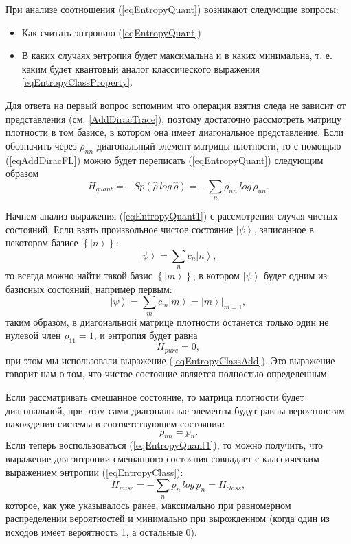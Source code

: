 При анализе соотношения (\ref{eqEntropyQuant}) возникают следующие
вопросы:
\begin{itemize}
\item Как считать энтропию (\ref{eqEntropyQuant})
\item В каких случаях энтропия будет максимальна и в каких минимальна,
  т. е. каким будет квантовый аналог классического выражения
  \ref{eqEntropyClassProperty}. 
\end{itemize}

Для ответа на первый вопрос вспомним что операция взятия следа не
зависит от представления (см. \autoref{AddDiracTrace}), поэтому
достаточно рассмотреть матрицу плотности в том базисе, в котором она имеет
диагональное представление. Если обозначить через $\rho_{nn}$
диагональный элемент матрицы плотности, то с помощью (\ref{eqAddDiracFL})
можно будет переписать (\ref{eqEntropyQuant}) следующим образом
\begin{equation}
H_{quant} = - Sp \left(\hat{\rho} \, log \, \hat{\rho}\right) = 
- \sum_n \rho_{nn} \, log \, \rho_{nn}.
\label{eqEntropyQuant1}
\end{equation}

Начнем анализ выражения (\ref{eqEntropyQuant1}) с рассмотрения случая чистых состояний.
Если взять произвольное чистое состояние $\left|\psi\right>$,
записанное в некотором базисе $\left\{\left|n\right>\right\}$:
\[
\left|\psi\right> = \sum_n c_n \left|n\right>,
\]
то всегда можно найти такой базис $\left\{\left|m\right>\right\}$, в
котором $\left|\psi\right>$ будет одним из базисных состояний, например первым: 
\[
\left|\psi\right> = \sum_m c_m \left|m\right> = 
\left.\left|m\right>\right|_{m = 1},
\]
таким образом, в диагональной матрице плотности останется только один
не нулевой член $\rho_{11} = 1$, и энтропия будет равна
\begin{equation}
H_{pure} = 0,
\label{eqQIEntropyPure}
\end{equation}
при этом мы использовали выражение (\ref{eqEntropyClassAdd}). Это
выражение говорит нам о том, что чистое состояние является полностью
определенным. 

Если рассматривать смешанное состояние, то матрица плотности будет
диагональной, при этом сами диагональные элементы будут равны
вероятностям нахождения системы в соответствующем состоянии:
\[
\rho_{nn} = p_n.
\]
Если теперь воспользоваться (\ref{eqEntropyQuant1}), то можно получить,
что выражение для энтропии смешанного состояния совпадает с
классическим выражением энтропии (\ref{eqEntropyClass}):
\begin{equation}
H_{misc} = - \sum_n p_n \, log \, p_n = H_{class},
\label{eqQIEntropyMisc}
\end{equation}
которое, как уже указывалось ранее, максимально при равномерном распределении
вероятностей и минимально при вырожденном (когда один из исходов имеет
вероятность 1, а остальные 0).

